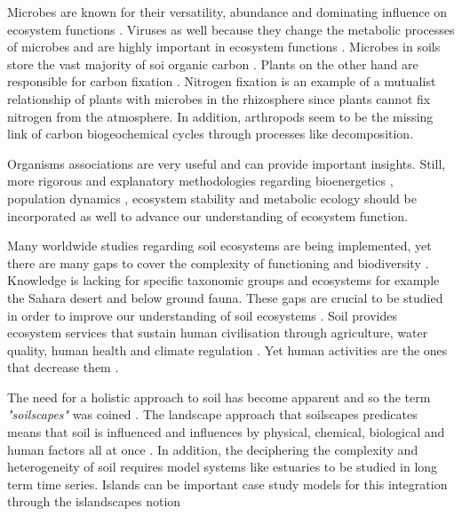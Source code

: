 Microbes are known for their versatility, abundance and dominating influence on ecosystem
functions \parencite{falkowski2008microbial}. 
Viruses as well because they
change the metabolic processes of microbes and are highly important in
ecosystem functions \parencite{hurwitz2016Viral}.
Microbes in soils store the vast majority of soi organic carbon \parencite{Crowther2019}.
Plants on the other hand are responsible for carbon fixation \parencite{thompson2012Food}.
Nitrogen fixation is an example of a mutualist relationship of plants with 
microbes in the rhizosphere since plants cannot fix nitrogen from the atmosphere.
In addition, arthropods seem to be the missing link of carbon biogeochemical 
cycles \parencite{GRANDY201640} through processes like decomposition.

Organisms associations are very useful and can
provide important insights. Still, more rigorous and explanatory methodologies
regarding bioenergetics \parencite{kempes2012Growth}, population dynamics
\parencite{gonze2018Microbial}, ecosystem stability \parencite{berdugo2020Global} and
metabolic ecology \parencite{brown2004METABOLIC} should be incorporated as well to
advance our understanding of ecosystem function.

Many worldwide studies regarding soil ecosystems are being implemented, yet
there are many gaps to cover the complexity of functioning and biodiversity
\parencite{guerra2020Blind}. Knowledge is lacking for specific taxonomic groups and
ecosystems for example the Sahara desert and below ground fauna.
These gaps are crucial to be studied in order to
improve our understanding of soil ecosystems \parencite{cameron2018Global}. 
Soil provides ecosystem services that sustain human civilisation 
through agriculture, water quality, human health and climate regulation \parencite{lehmann2020concept, lal2021the-role}.
Yet human activities are the ones that decrease them \parencite{rillig2023Increasing}. 

The need for a holistic approach to soil has become apparent and so the term \textit{"soilscapes"}
was coined \parencite{LAGACHERIE2001105}.
The landscape approach that soilscapes predicates means that soil is 
influenced and influences by physical, chemical, biological and 
human factors all at once \parencite{vogel2022}.
In addition, the deciphering the complexity and heterogeneity of soil requires 
model systems like estuaries \parencite{tsiknia2014} to be studied in long 
term time series.
Islands can be important case study models for this integration
through the islandscapes notion \parencite{Vogiatzakis_land_2017, Davies2016}

